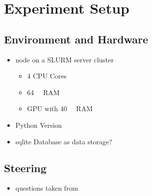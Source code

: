 \chapter{Experiment Setup}
\label{sec:experimentSetup}


\section{Environment and Hardware}
\label{sec:experimentSetup:environmentHardware}

\begin{itemize}
  \item node on a SLURM server cluster
        \begin{itemize}
          \item 4 CPU Cores %
          \item \SI{64}{\giga\byte} RAM %
          \item GPU with \SI{40}{\giga\byte} RAM
        \end{itemize}
  \item Python Version
  \item sqlite Database as data storage?
\end{itemize}

\section{Steering}
\label{sec:experimentSetup:steering}

\begin{itemize}
  \item questions taken from \citet{petroni-etal-2021-kilt,rooeinKnowYourAudience2023}
\end{itemize}
